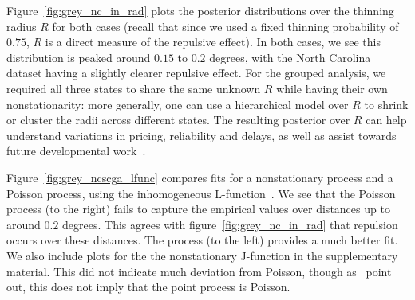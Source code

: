 \documentclass{statsoc}
\begin{document}
Figure~\ref{fig:grey_nc_in_rad} plots the posterior distributions over the thinning radius $R$ for both cases (recall that
since we used a fixed thinning probability of $0.75$, $R$ is a direct measure of the repulsive effect). 
In both cases, we see this distribution is peaked around $0.15$ to $0.2$ degrees, with the North Carolina dataset having a slightly clearer
repulsive effect. %
For the grouped analysis, we required all three states to share the same unknown $R$ while having their own nonstationarity: more generally, one can 
use a hierarchical model over $R$ to shrink or cluster the radii across different states. The resulting posterior over $R$ can help understand 
variations in pricing, reliability and delays, as well as assist towards future developmental work~\citep{Sahin2007}.

Figure~\ref{fig:grey_ncscga_lfunc} compares fits for a nonstationary \matern process and a Poisson process, using the inhomogeneous
L-function~\citep{Baddely2000}. %
We see that the Poisson process (to the right) fails
to capture the empirical values over distances up to around $0.2$ degrees. This agrees with  figure~\ref{fig:grey_nc_in_rad} that repulsion occurs over 
these distances. The \matern process (to the left) provides a much better fit. %
We also include plots for the the nonstationary J-function in the supplementary material. This did not indicate much deviation from Poisson, 
though as~\cite{Baddely2000} point out, this does not imply that the point process is Poisson. %
\end{document}
